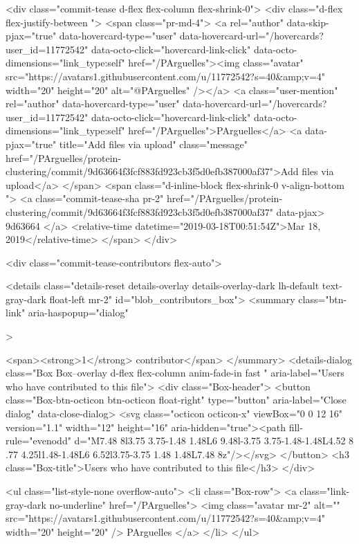     
  <div class="commit-tease d-flex flex-column flex-shrink-0">
      <div class="d-flex flex-justify-between ">
        <span class="pr-md-4">
          <a rel="author" data-skip-pjax="true" data-hovercard-type="user" data-hovercard-url="/hovercards?user_id=11772542" data-octo-click="hovercard-link-click" data-octo-dimensions="link_type:self" href="/PArguelles"><img class="avatar" src="https://avatars1.githubusercontent.com/u/11772542?s=40&amp;v=4" width="20" height="20" alt="@PArguelles" /></a>
          <a class="user-mention" rel="author" data-hovercard-type="user" data-hovercard-url="/hovercards?user_id=11772542" data-octo-click="hovercard-link-click" data-octo-dimensions="link_type:self" href="/PArguelles">PArguelles</a>
            <a data-pjax="true" title="Add files via upload" class="message" href="/PArguelles/protein-clustering/commit/9d63664f3fcf883fd923cb3f5d0efb387000af37">Add files via upload</a>
        </span>
        <span class="d-inline-block flex-shrink-0 v-align-bottom ">
          <a class="commit-tease-sha pr-2" href="/PArguelles/protein-clustering/commit/9d63664f3fcf883fd923cb3f5d0efb387000af37" data-pjax>
            9d63664
          </a>
          <relative-time datetime="2019-03-18T00:51:54Z">Mar 18, 2019</relative-time>
        </span>
      </div>

    <div class="commit-tease-contributors flex-auto">
      
<details class="details-reset details-overlay details-overlay-dark lh-default text-gray-dark float-left mr-2" id="blob_contributors_box">
  <summary
      class="btn-link"
      aria-haspopup="dialog"
      
      
      >
    
    <span><strong>1</strong> contributor</span>
  </summary>
  <details-dialog class="Box Box--overlay d-flex flex-column anim-fade-in fast " aria-label="Users who have contributed to this file">
    <div class="Box-header">
      <button class="Box-btn-octicon btn-octicon float-right" type="button" aria-label="Close dialog" data-close-dialog>
        <svg class="octicon octicon-x" viewBox="0 0 12 16" version="1.1" width="12" height="16" aria-hidden="true"><path fill-rule="evenodd" d="M7.48 8l3.75 3.75-1.48 1.48L6 9.48l-3.75 3.75-1.48-1.48L4.52 8 .77 4.25l1.48-1.48L6 6.52l3.75-3.75 1.48 1.48L7.48 8z"/></svg>
      </button>
      <h3 class="Box-title">Users who have contributed to this file</h3>
    </div>
    
        <ul class="list-style-none overflow-auto">
            <li class="Box-row">
              <a class="link-gray-dark no-underline" href="/PArguelles">
                <img class="avatar mr-2" alt="" src="https://avatars1.githubusercontent.com/u/11772542?s=40&amp;v=4" width="20" height="20" />
                PArguelles
</a>            </li>
        </ul>

